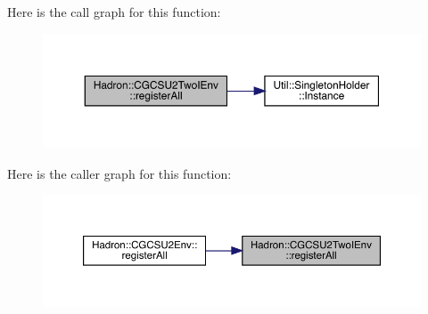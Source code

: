 Here is the call graph for this function\+:\nopagebreak
\begin{figure}[H]
\begin{center}
\leavevmode
\includegraphics[width=350pt]{d5/d44/namespaceHadron_1_1CGCSU2TwoIEnv_aed4e8b3bb2141bf8176b9a6be35b2406_cgraph}
\end{center}
\end{figure}
Here is the caller graph for this function\+:\nopagebreak
\begin{figure}[H]
\begin{center}
\leavevmode
\includegraphics[width=350pt]{d5/d44/namespaceHadron_1_1CGCSU2TwoIEnv_aed4e8b3bb2141bf8176b9a6be35b2406_icgraph}
\end{center}
\end{figure}
